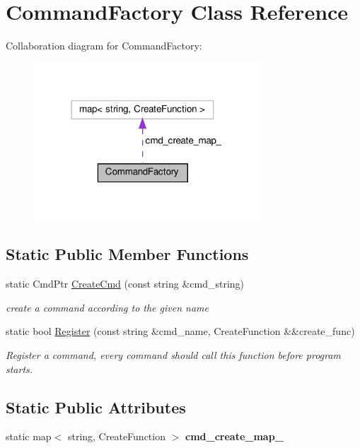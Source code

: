\hypertarget{classCommandFactory}{}\section{Command\+Factory Class Reference}
\label{classCommandFactory}


Collaboration diagram for Command\+Factory\+:\nopagebreak
\begin{figure}[H]
\begin{center}
\leavevmode
\includegraphics[width=239pt]{classCommandFactory__coll__graph}
\end{center}
\end{figure}
\subsection*{Static Public Member Functions}
\begin{DoxyCompactItemize}
\item 
static Cmd\+Ptr \hyperlink{classCommandFactory_aec56c7b106ab048346e8d3119de83c57}{Create\+Cmd} (const string \&cmd\+\_\+string)
\begin{DoxyCompactList}\small\item\em create a command according to the given {\ttfamily name} \end{DoxyCompactList}\item 
static bool \hyperlink{classCommandFactory_a0a17b908385bd5087bd1cb45ae6b0639}{Register} (const string \&cmd\+\_\+name, Create\+Function \&\&create\+\_\+func)
\begin{DoxyCompactList}\small\item\em Register a command, every command should call this function before program starts. \end{DoxyCompactList}\end{DoxyCompactItemize}
\subsection*{Static Public Attributes}
\begin{DoxyCompactItemize}
\item 
\mbox{\label{classCommandFactory_a3399fec7a8ec044d7c184999b98ba830}} 
static map$<$ string, Create\+Function $>$ {\bfseries cmd\+\_\+create\+\_\+map\+\_\+}
\end{DoxyCompactItemize}


